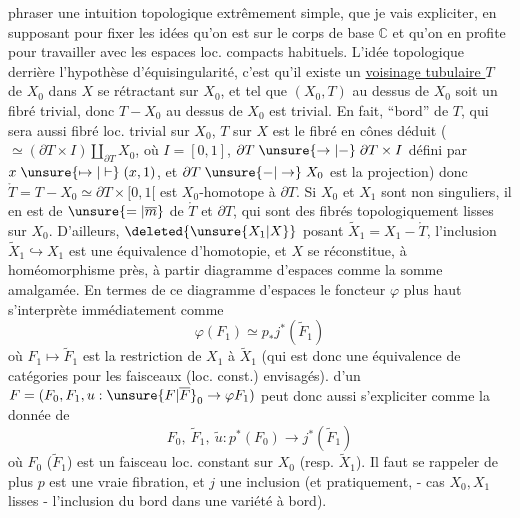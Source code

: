 phraser une intuition topologique extrêmement simple, que je vais expliciter, en supposant pour fixer les idées qu'on est sur le corps de base $\mathbb C$ et qu'on en profite pour travailler avec les espaces loc. compacts habituels. L'idée topologique derrière l'hypothèse d'équisingularité, c'est qu'il existe un \uline{voisinage tubulaire $T$} de $X_0$ dans $X$ se rétractant sur $X_0$, et tel que $(X_0,T)$ au dessus de $X_0$ soit un fibré  trivial, donc $T-X_0$ au dessus de $X_0$ est  trivial. En fait,   ``bord'' de $T$, qui sera aussi fibré loc. trivial sur $X_0$, $T$ sur $X$ est le fibré en cônes déduit ($\simeq(\partial T\times I)\amalg_{\partial T}X_0$, où $I=[0,1]$, $\partial T\mathrel{\unsure{\to|-}}\partial T\times I$ défini par $x\mathrel{\unsure{\mapsto|\vdash}}(x,1)$, et $\partial T\mathrel{\unsure{-|\to}}X_0$ est la projection) donc $\mathring T=T-X_0\simeq\partial T\times[0,1[$ est $X_0$-homotope à $\partial T$. Si $X_0$ et $X_1$ sont non singuliers, il en est de $\unsure{=|\overline m}$ de $\mathring T$ et $\partial T$, qui sont des fibrés topologiquement lisses sur $X_0$. D'ailleurs, $\deleted{\unsure{X_1|X}}$ posant $\widetilde X_1=X_1-\mathring T$,  l'inclusion $\widetilde X_1\hookrightarrow X_1$ est une équivalence d'homotopie, et $X$ se réconstitue, à homéomorphisme près, à partir  diagramme d'espaces
comme la somme amalgamée. En termes de ce diagramme d'espaces\unsure{;|,} le foncteur $\varphi$ plus
haut s'interprète immédiatement comme
\[
\varphi(F_1)\simeq p_*j^*(\widetilde F_1)
\]
où $F_1\mapsto\widetilde F_1$ est la restriction de $X_1$ à $\widetilde X_1$ (qui est donc une équivalence de catégories pour les faisceaux (loc. const.) envisagés).   d'un $F=(F_0,F_1,u:\unsure{F|\overline F}_0\to\varphi F_1)$ peut donc aussi s'expliciter comme la donnée de
\[
F_0,\ \widetilde F_1,\ \widetilde u:p^*(F_0)\longrightarrow j^*(\widetilde F_1)
\]
où $F_0$ ($\widetilde F_1$) est un faisceau loc. constant sur $X_0$ (resp. $\widetilde X_1$). Il faut se rappeler de plus  $p$ est une vraie fibration, et $j$ une inclusion (et pratiquement, - cas $X_0,X_1$ lisses -  l'inclusion du bord dans une variété à bord).

